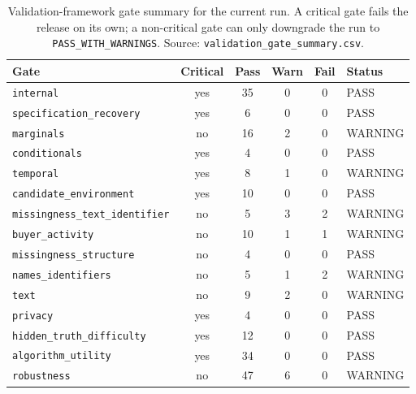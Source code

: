 \begin{table}[htbp]
\centering
\small
\caption{Validation-framework gate summary for the current run. A critical gate fails the release on its own; a non-critical gate can only downgrade the run to \texttt{PASS\_WITH\_WARNINGS}. Source: \texttt{validation\_gate\_summary.csv}.}
\label{tab:gates}
\begin{tabularx}{\textwidth}{>{\raggedright\arraybackslash}Xccccl}
\toprule
Gate & Critical & Pass & Warn & Fail & Status \\
\midrule
\texttt{internal} & yes & 35 & 0 & 0 & PASS \\
\texttt{specification\_recovery} & yes & 6 & 0 & 0 & PASS \\
\texttt{marginals} & no & 16 & 2 & 0 & WARNING \\
\texttt{conditionals} & yes & 4 & 0 & 0 & PASS \\
\texttt{temporal} & yes & 8 & 1 & 0 & WARNING \\
\texttt{candidate\_environment} & yes & 10 & 0 & 0 & PASS \\
\texttt{missingness\_text\_identifier} & no & 5 & 3 & 2 & WARNING \\
\texttt{buyer\_activity} & no & 10 & 1 & 1 & WARNING \\
\texttt{missingness\_structure} & no & 4 & 0 & 0 & PASS \\
\texttt{names\_identifiers} & no & 5 & 1 & 2 & WARNING \\
\texttt{text} & no & 9 & 2 & 0 & WARNING \\
\texttt{privacy} & yes & 4 & 0 & 0 & PASS \\
\texttt{hidden\_truth\_difficulty} & yes & 12 & 0 & 0 & PASS \\
\texttt{algorithm\_utility} & yes & 34 & 0 & 0 & PASS \\
\texttt{robustness} & no & 47 & 6 & 0 & WARNING \\
\bottomrule
\end{tabularx}
\end{table}
